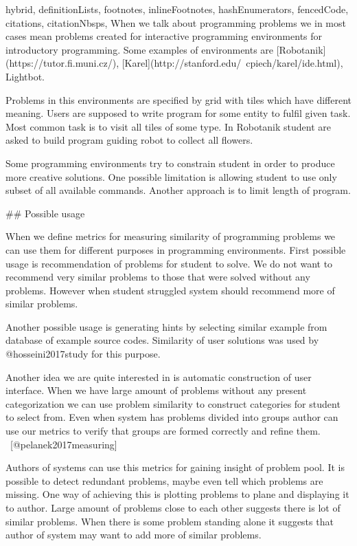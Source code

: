 \documentclass[
  digital, %
  table,   %
  lof,     %
  lot,     %
]{fithesis3}
\begin{document}
\begin{markdown*}{%
  hybrid,
  definitionLists,
  footnotes,
  inlineFootnotes,
  hashEnumerators,
  fencedCode,
  citations,
  citationNbsps,
}
When we talk about programming problems we in most cases mean problems created for interactive programming environments for introductory programming. Some examples of environments are [Robotanik](https://tutor.fi.muni.cz/), [Karel](http://stanford.edu/~cpiech/karel/ide.html), Lightbot.

Problems in this environments are specified by grid with tiles which have different meaning. Users are supposed to write program for some entity to fulfil given task. Most common task is to visit all tiles of some type. In Robotanik student are asked to build program guiding robot to collect all flowers.

Some programming environments try to constrain student in order to produce more creative solutions. One possible limitation is allowing student to use only subset of all available commands. Another approach is to limit length of program.

## Possible usage

When we define metrics for measuring similarity of programming problems we can use them for different purposes in programming environments. First possible usage is recommendation of problems for student to solve. We do not want to recommend very similar problems to those that were solved without any problems. However when student struggled system should recommend more of similar problems.

Another possible usage is generating hints by selecting similar example from database of example source codes. Similarity of user solutions was used by @hosseini2017study for this purpose.

Another idea we are quite interested in is automatic construction of user interface. When we have large amount of problems without any present categorization we can use problem similarity to construct categories for student to select from. Even when system has problems divided into groups author can use our metrics to verify that groups are formed correctly and refine them. ~[@pelanek2017measuring]

Authors of systems can use this metrics for gaining insight of problem pool. It is possible to detect redundant problems, maybe even tell which problems are missing. One way of achieving this is plotting problems to plane and displaying it to author. Large amount of problems close to each other suggests there is lot of similar problems. When there is some problem standing alone it suggests that author of system may want to add more of similar problems.


\end{markdown*}
\end{document}
